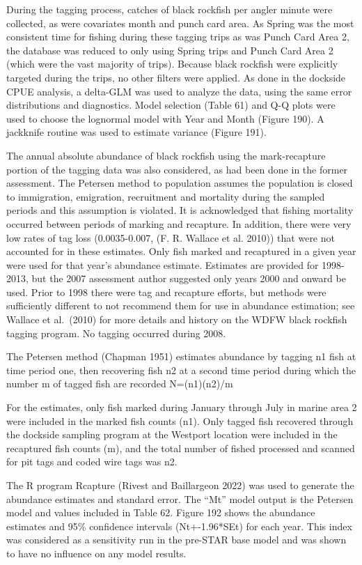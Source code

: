 \documentclass[11pt,
  english,
  letterpaper,
]{article}
\begin{document}
During the tagging process, catches of black rockfish per angler minute were collected, as were covariates month and punch card area. As Spring was the most consistent time for fishing during these tagging trips as was Punch Card Area 2, the database was reduced to only using Spring trips and Punch Card Area 2 (which were the vast majority of trips). Because black rockfish were explicitly targeted during the trips, no other filters were applied. As done in the dockside CPUE analysis, a delta-GLM was used to analyze the data, using the same error distributions and diagnostics. Model selection (Table 61) and Q-Q plots were used to choose the lognormal model with Year and Month (Figure 190). A jackknife routine was used to estimate variance (Figure 191).

The annual absolute abundance of black rockfish using the mark-recapture portion of the tagging data was also considered, as had been done in the former assessment. The Petersen method to population assumes the population is closed to immigration, emigration, recruitment and mortality during the sampled periods and this assumption is violated. It is acknowledged that fishing mortality occurred between periods of marking and recapture. In addition, there were very low rates of tag loss (0.0035-0.007, (F. R. Wallace et al. 2010)) that were not accounted for in these estimates. Only fish marked and recaptured in a given year were used for that year's abundance estimate. Estimates are provided for 1998-2013, but the 2007 assessment author suggested only years 2000 and onward be used. Prior to 1998 there were tag and recapture efforts, but methods were sufficiently different to not recommend them for use in abundance estimation; see Wallace et al.~(2010) for more details and history on the WDFW black rockfish tagging program. No tagging occurred during 2008.

The Petersen method (Chapman 1951) estimates abundance by tagging n1 fish at time period one, then recovering fish n2 at a second time period during which the number m of tagged fish are recorded N=(n1)(n2)/m

For the estimates, only fish marked during January through July in marine area 2 were included in the marked fish counts (n1). Only tagged fish recovered through the dockside sampling program at the Westport location were included in the recaptured fish counts (m), and the total number of fished processed and scanned for pit tags and coded wire tags was n2.

The R program Rcapture (Rivest and Baillargeon 2022) was used to generate the abundance estimates and standard error. The ``Mt'' model output is the Petersen model and values included in Table 62. Figure 192 shows the abundance estimates and 95\% confidence intervals (Nt+-1.96*SEt) for each year. This index was considered as a sensitivity run in the pre-STAR base model and was shown to have no influence on any model results.
\end{document}
